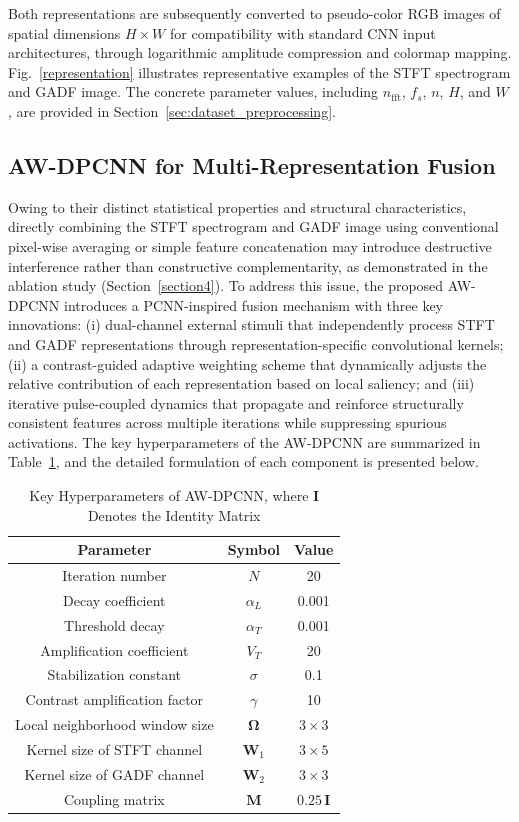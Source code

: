 \documentclass[pdflatex,sn-mathphys-num]{sn-jnl}
\theoremstyle{thmstyleone}%
\theoremstyle{thmstyletwo}%
\theoremstyle{thmstylethree}%
\begin{document}
Both representations are subsequently converted to pseudo-color RGB images of spatial dimensions $H \times W$ for compatibility with standard CNN input architectures, through logarithmic amplitude compression and colormap mapping. Fig.~\ref{representation} illustrates representative examples of the STFT spectrogram and GADF image. The concrete parameter values, including $n_{\mathrm{fft}}$, $f_s$, $n$, $H$, and $W$, are provided in Section~\ref{sec:dataset_preprocessing}.

\subsection{AW-DPCNN for Multi-Representation Fusion}
\label{sec:awdpcnn}

Owing to their distinct statistical properties and structural characteristics, directly combining the STFT spectrogram and GADF image using conventional pixel-wise averaging or simple feature concatenation may introduce destructive interference rather than constructive complementarity, as demonstrated in the ablation study (Section~\ref{section4}). To address this issue, the proposed AW-DPCNN introduces a PCNN-inspired fusion mechanism with three key innovations: (i) dual-channel external stimuli that independently process STFT and GADF representations through representation-specific convolutional kernels; (ii) a contrast-guided adaptive weighting scheme that dynamically adjusts the relative contribution of each representation based on local saliency; and (iii) iterative pulse-coupled dynamics that propagate and reinforce structurally consistent features across multiple iterations while suppressing spurious activations. The key hyperparameters of the AW-DPCNN are summarized in Table~\ref{tab:awdpcnn_params}, and the detailed formulation of each component is presented below.

\begin{table}[!t]
	\caption{Key Hyperparameters of AW-DPCNN, where $\mathbf{I}$ Denotes the Identity Matrix\label{tab:awdpcnn_params}}
	\centering
	\begin{tabular}{ccc}
		\hline
		\textbf{Parameter} & \textbf{Symbol} & \textbf{Value} \\
		\hline
		Iteration number & $N$ & 20 \\
		Decay coefficient & $\alpha_L$ & 0.001 \\
		Threshold decay & $\alpha_T$ & 0.001 \\
		Amplification coefficient & $V_T$ & 20 \\
		Stabilization constant & $\sigma$ & 0.1 \\
		Contrast amplification factor & $\gamma$ & 10 \\
		Local neighborhood window size & $\boldsymbol{\Omega}$ & $3 \times 3$ \\
		Kernel size of STFT channel & $\boldsymbol{W}_1$ & $3 \times 5$ \\
		Kernel size of GADF channel & $\boldsymbol{W}_2$ & $3 \times 3$ \\
		Coupling matrix & $\boldsymbol{M}$ & $0.25\,\mathbf{I}$ \\
		\hline
	\end{tabular}
\end{table}
\end{document}

